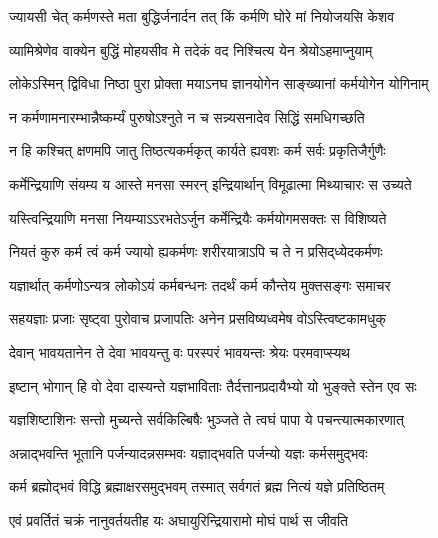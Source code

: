 
\twolineshloka
{ज्यायसी चेत् कर्मणस्ते मता बुद्धिर्जनार्दन}
{तत् किं कर्मणि घोरे मां नियोजयसि केशव}%

\twolineshloka
{व्यामिश्रेणेव वाक्येन बुद्धिं मोहयसीव मे}
{तदेकं वद निश्चित्य येन श्रेयोऽहमाप्नुयाम्}%

\twolineshloka
{लोकेऽस्मिन् द्विविधा निष्ठा पुरा प्रोक्ता मयाऽनघ}
{ज्ञानयोगेन साङ्ख्यानां कर्मयोगेन योगिनाम्}%

\twolineshloka
{न कर्मणामनारम्भान्नैष्कर्म्यं पुरुषोऽश्नुते}
{न च सन्न्यसनादेव सिद्धिं समधिगच्छति}%

\twolineshloka
{न हि कश्चित् क्षणमपि जातु तिष्ठत्यकर्मकृत्}
{कार्यते ह्यवशः कर्म सर्वः प्रकृतिजैर्गुणैः}%

\twolineshloka
{कर्मेन्द्रियाणि संयम्य य आस्ते मनसा स्मरन्}
{इन्द्रियार्थान् विमूढात्मा मिथ्याचारः स उच्यते}%

\twolineshloka
{यस्त्विन्द्रियाणि मनसा नियम्याऽऽरभतेऽर्जुन}
{कर्मेन्द्रियैः कर्मयोगमसक्तः स विशिष्यते}%

\twolineshloka
{नियतं कुरु कर्म त्वं कर्म ज्यायो ह्यकर्मणः}
{शरीरयात्राऽपि च ते न प्रसिद्‌ध्येदकर्मणः}%

\twolineshloka
{यज्ञार्थात् कर्मणोऽन्यत्र लोकोऽयं कर्मबन्धनः}
{तदर्थं कर्म कौन्तेय मुक्तसङ्गः समाचर}%

\twolineshloka
{सहयज्ञाः प्रजाः सृष्ट्वा पुरोवाच प्रजापतिः}
{अनेन प्रसविष्यध्वमेष वोऽस्त्विष्टकामधुक्}%

\twolineshloka
{देवान् भावयतानेन ते देवा भावयन्तु वः}
{परस्परं भावयन्तः श्रेयः परमवाप्स्यथ}%

\twolineshloka
{इष्टान् भोगान् हि वो देवा दास्यन्ते यज्ञभाविताः}
{तैर्दत्तानप्रदायैभ्यो यो भुङ्क्ते स्तेन एव सः}%

\twolineshloka
{यज्ञशिष्टाशिनः सन्तो मुच्यन्ते सर्वकिल्बिषैः}
{भुञ्जते ते त्वघं पापा ये पचन्त्यात्मकारणात्}%

\twolineshloka
{अन्नाद्भवन्ति भूतानि पर्जन्यादन्नसम्भवः}
{यज्ञाद्भवति पर्जन्यो यज्ञः कर्मसमुद्भवः}%

\twolineshloka
{कर्म ब्रह्मोद्भवं विद्धि ब्रह्माक्षरसमुद्भवम्}
{तस्मात् सर्वगतं ब्रह्म नित्यं यज्ञे प्रतिष्ठितम्}%

\twolineshloka
{एवं प्रवर्तितं चक्रं नानुवर्तयतीह यः}
{अघायुरिन्द्रियारामो मोघं पार्थ स जीवति}%

